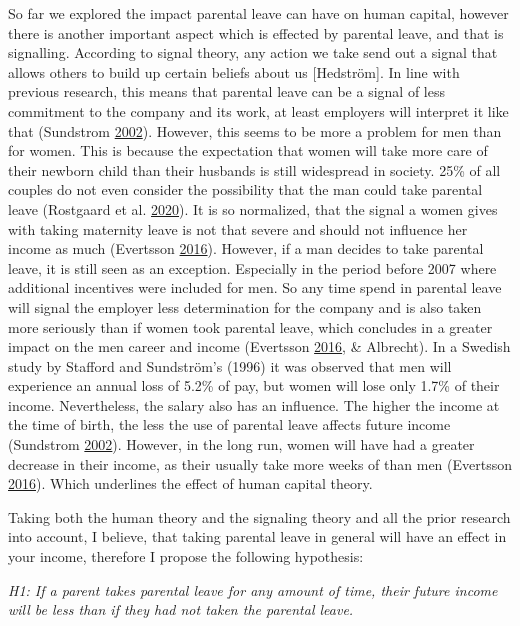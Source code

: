 \documentclass[
  12pt,
]{article}
\begin{document}
So far we explored the impact parental leave can have on human capital, however there is another important aspect which is effected by parental leave, and that is signalling. According to signal theory, any action we take send out a signal that allows others to build up certain beliefs about us {[}Hedström{]}. In line with previous research, this means that parental leave can be a signal of less commitment to the company and its work, at least employers will interpret it like that (Sundstrom \protect\hyperlink{ref-sundstrom_gender_2002}{2002}). However, this seems to be more a problem for men than for women. This is because the expectation that women will take more care of their newborn child than their husbands is still widespread in society. 25\% of all couples do not even consider the possibility that the man could take parental leave (Rostgaard et al. \protect\hyperlink{ref-rostgaard_parental_2020}{2020}). It is so normalized, that the signal a women gives with taking maternity leave is not that severe and should not influence her income as much (Evertsson \protect\hyperlink{ref-evertsson_parental_2016}{2016}). However, if a man decides to take parental leave, it is still seen as an exception. Especially in the period before 2007 where additional incentives were included for men. So any time spend in parental leave will signal the employer less determination for the company and is also taken more seriously than if women took parental leave, which concludes in a greater impact on the men career and income (Evertsson \protect\hyperlink{ref-evertsson_parental_2016}{2016}, \& Albrecht). In a Swedish study by Stafford and Sundström's (1996) it was observed that men will experience an annual loss of 5.2\% of pay, but women will lose only 1.7\% of their income. Nevertheless, the salary also has an influence. The higher the income at the time of birth, the less the use of parental leave affects future income (Sundstrom \protect\hyperlink{ref-sundstrom_gender_2002}{2002}). However, in the long run, women will have had a greater decrease in their income, as their usually take more weeks of than men (Evertsson \protect\hyperlink{ref-evertsson_parental_2016}{2016}). Which underlines the effect of human capital theory.

Taking both the human theory and the signaling theory and all the prior research into account, I believe, that taking parental leave in general will have an effect in your income, therefore I propose the following hypothesis:

\emph{H1: If a parent takes parental leave for any amount of time, their future income will be less than if they had not taken the parental leave.}
\end{document}
